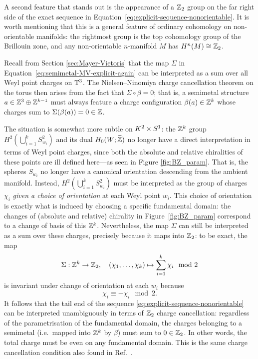 A second feature that stands out is the appearance of a $\mathbb{Z}_2$ group on the far right side of the exact sequence in Equation~\eqref{eq:explicit-sequence-nonorientable}. It is worth mentioning that this is a general feature of ordinary cohomology on non-orientable manifolds: the rightmost group is the top cohomology group of the Brillouin zone, and any non-orientable $n$-manifold $M$ has $H^n(M)\cong\mathbb{Z}_2$.

Recall from Section \ref{sec:Mayer-Vietoris} that the map $\Sigma$ in Equation~\eqref{eq:semimetal-MV-explicit-again} can be interpreted as a sum over all Weyl point charges on $\mathbb{T}^3$. The Nielsen--Ninomiya charge cancellation theorem on the torus then arises from the fact that $\Sigma\circ\beta = 0$; that is, a semimetal structure $a\in\mathbb{Z}^3\oplus\mathbb{Z}^{k-1}$ must always feature a charge configuration $\beta(a)\in\mathbb{Z}^k$ whose charges sum to $\Sigma(\beta(a)) = 0 \in \mathbb{Z}$.

The situation is somewhat more subtle on $K^2\times S^1$: the $\mathbb{Z}^k$ group $H^2\!\left(\bigcup_{i=1}^k S_{w_i}^2\right)$ and its dual $H_0(W;\widetilde{\mathbb{Z}})$ no longer have a direct interpretation in terms of Weyl point charges, since both the absolute and relative chiralities of these points are ill defined here---as seen in Figure \ref{fig:BZ_param}. That is, the spheres $S_{w_i}$ no longer have a canonical orientation descending from the ambient manifold. Instead, $H^2\!\left(\bigcup_{i=1}^k S_{w_i}^2\right)$ must be interpreted as the group of charges $\chi_i$ \emph{given a choice of orientation} at each Weyl point $w_i$. This choice of orientation is exactly what is induced by choosing a specific fundamental domain: the changes of (absolute and relative) chirality in Figure~\ref{fig:BZ_param} correspond to a change of basis of this $\mathbb{Z}^k$. Nevertheless, the map $\Sigma$ can still be interpreted as a sum over these charges, precisely because it maps into $\mathbb{Z}_2$: to be exact, the map
\begin{equation}\label{eq:map-sigma}
	\Sigma: \mathbb{Z}^k\to\mathbb{Z}_2,\quad (\chi_1,\ldots,\chi_k) \mapsto \sum_{i=1}^{k}\chi_i \mod 2
\end{equation}
is invariant under change of orientation at each $w_i$ because
\begin{equation*}
	\chi_i \equiv -\chi_i \mod 2.
\end{equation*}
It follows that the tail end of the sequence \eqref{eq:explicit-sequence-nonorientable} can be interpreted unambiguously in terms of $\mathbb{Z}_2$ charge cancellation: regardless of the parametrisation of the fundamental domain, the charges belonging to a semimetal (i.e.\ mapped into $\mathbb{Z}^k$ by $\beta$) must sum to $0\in\mathbb{Z}_2$. In other words, the total charge must be even on any fundamental domain. This is the same charge cancellation condition also found in Ref.~\cite{Fonseca-Vaidya_nonorientable}.

